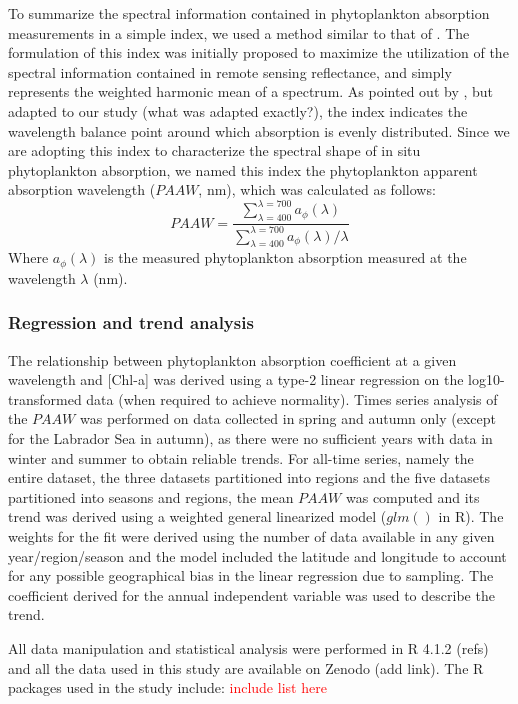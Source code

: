 \documentclass[utf8]{frontiersSCNS} %
\begin{document}
To summarize the spectral information contained in phytoplankton absorption measurements in a simple index, we used a method similar to that of \cite{Vandermeulen2020}. The formulation of this index was initially proposed to maximize the utilization of the spectral information contained in remote sensing reflectance, and simply represents the weighted harmonic mean of a spectrum. As pointed out by \cite{Vandermeulen2020}, but adapted to our study (what was adapted exactly?), the index indicates the wavelength balance point around which absorption is evenly distributed. Since we are adopting this index to characterize the spectral shape of in situ phytoplankton absorption, we named this index the phytoplankton apparent absorption wavelength ($PAAW$, nm), which was calculated as follows:
\begin{equation}
PAAW = \frac{ \sum\limits_{\lambda = 400}^{\lambda=700} a_\phi(\lambda)} {\sum\limits_{\lambda = 400}^{\lambda=700} a_\phi(\lambda) /  \lambda}%
\end{equation}
Where $a_\phi(\lambda)$  is the measured phytoplankton absorption measured at the wavelength $\lambda$ (nm).

\subsubsection{Regression and trend analysis}
The relationship between phytoplankton absorption coefficient at a given wavelength and [Chl-a] was derived using a type-2 linear regression on the log10-transformed data (when required to achieve normality). Times series analysis of the $PAAW$ was performed on data collected in spring and autumn only (except for the Labrador Sea in autumn), as there were no sufficient years with data in winter and summer to obtain reliable trends. For all-time series, namely the entire dataset, the three datasets partitioned into regions and the five datasets partitioned into seasons and regions, the mean $PAAW$ was computed and its trend was derived using a weighted general linearized model ($glm()$ in R). The weights for the fit were derived using the number of data available in any given year/region/season and the model included the latitude and longitude to account for any possible geographical bias in the linear regression due to sampling. The coefficient derived for the annual independent variable was used to describe the trend. 

All data manipulation and statistical analysis were performed in R 4.1.2 (refs) and all the data used in this study are available on Zenodo (add link). The R packages used in the study include: \textcolor{red}{include list here}
\end{document}
